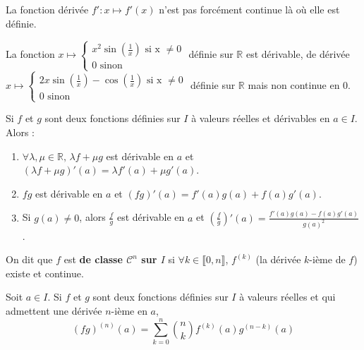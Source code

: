 
	\begin{remark}
		La fonction dérivée $f' : x \mapsto f'(x)$ n'est pas forcément continue là où elle est définie.
	\end{remark}

	\begin{example}
		La fonction $x \mapsto \begin{cases}
			x^2 \sin \left(\frac{1}{x}\right) \text{ si x } \neq 0 \\
			0 \text{ sinon}
		\end{cases}$ définie sur $\mathbb{R}$ est dérivable, de dérivée $x \mapsto \begin{cases}
		2x \sin \left(\frac{1}{x}\right) - \cos \left(\frac{1}{x}\right) \text{ si x } \neq 0 \\
		0 \text{ sinon}
		\end{cases}$ définie sur $\mathbb{R}$ mais non continue en $0$.
	\end{example}

	\begin{proposition}
		Si $f$ et $g$ sont deux fonctions définies sur $I$ à valeurs réelles et dérivables en $a \in I$. Alors :
		\begin{enumerate}[label=(\roman*)]
			\item $\forall \lambda, \mu \in \mathbb{R}, \, \lambda f + \mu g$ est dérivable en $a$ et $(\lambda f + \mu g)'(a) = \lambda f'(a) + \mu g'(a)$.
			\item $fg$ est dérivable en $a$ et $(fg)'(a) = f'(a) g(a) + f(a) g'(a)$.
			\item Si $g(a) \neq 0$, alors $\frac{f}{g}$ est dérivable en $a$ et $\left(\frac{f}{g}\right)'(a) = \frac{f'(a) g(a) - f(a) g'(a)}{g(a)^2}$.
 		\end{enumerate}
	\end{proposition}

	\begin{definition}
		On dit que $f$ est \textbf{de classe $\mathcal{C}^n$ sur $I$} si $\forall k \in \llbracket 0, n \rrbracket$, $f^{(k)}$ (la dérivée $k$-ième de $f$) existe et continue.
	\end{definition}

	\begin{proposition}
		Soit $a \in I$. Si $f$ et $g$ sont deux fonctions définies sur $I$ à valeurs réelles et qui admettent une dérivée $n$-ième en $a$,
		\[ (fg)^{(n)}(a) = \sum_{k=0}^n \binom{n}{k} f^{(k)}(a) g^{(n-k)}(a) \]
	\end{proposition}


